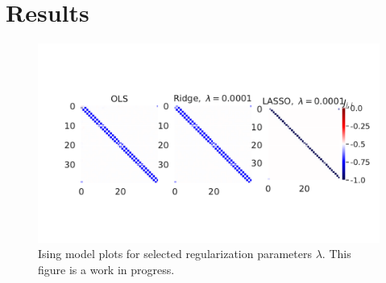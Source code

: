\section{Results}
\begin{figure}[h]
\includegraphics[width = 0.8\paperwidth]{figures/regression_mehta_1.pdf} 
\caption{Ising model plots for selected regularization parameters $\lambda$.
	 This figure is a work in progress.} 
\label{fig:regression-mehta}
\end{figure}


